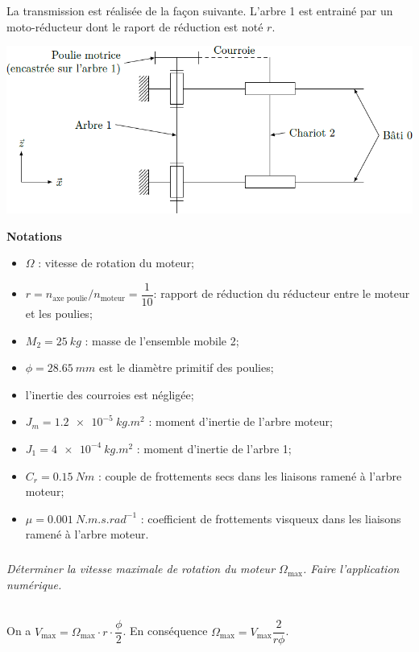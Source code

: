 \documentclass[10pt,fleqn]{article} %
\begin{document}
\begin{multicols}{2}
\ifprof
\else
La transmission est réalisée de la façon suivante. L'arbre 1 est entrainé par un moto-réducteur dont le raport de réduction est noté $r$. 

\begin{center}
\includegraphics[width=\linewidth]{images/fig_05}
\end{center}

\noindent\textbf{Notations}
\begin{itemize}
\item $\Omega$ : vitesse de rotation du moteur;
\item $r=n_{\text{axe poulie}}/n_{\text{moteur}}=\dfrac{1}{10}$: rapport de réduction du réducteur entre le moteur et les poulies;
\item $M_2 = \SI{25}{kg}$ : masse de l’ensemble mobile 2;
\item $\phi = \SI{28,65}{mm}$ est le diamètre primitif des poulies;
\item l’inertie des courroies est négligée;
\item $J_m = \SI{1,2e-5}{kg.m^2}$ : moment d’inertie de l’arbre moteur;
\item $J_1 = \SI{4e-4}{kg.m^2}$ : moment d’inertie de l’arbre 1;
\item $C_r = \SI{0,15}{Nm}$ : couple de frottements secs dans les liaisons ramené à l’arbre moteur;
\item $\mu = \SI{0,001}{N.m.s.rad^{-1}}$ : coefficient de frottements visqueux dans les liaisons ramené à l’arbre moteur.
\end{itemize}
\fi

\subparagraph{}\textit{Déterminer la vitesse maximale de rotation du moteur $\Omega_{\text{max}}$. Faire l’application numérique.}
\ifprof
\begin{corrige}~\\
On a $V_{\text{max}}=\Omega_{\text{max}}\cdot r \cdot \dfrac{\phi}{2}$. En conséquence 
$\Omega_{\text{max}}=V_{\text{max}}\dfrac{2}{r \phi}$. 


\end{corrige}
\end{multicols}
\end{document}
